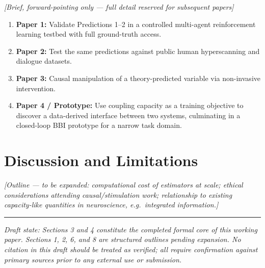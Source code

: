 \documentclass[11pt]{article}
\begin{document}
\textit{[Brief, forward-pointing only --- full detail reserved for subsequent papers]}

\begin{enumerate}[leftmargin=1.4em]
    \item \textbf{Paper 1:} Validate Predictions 1--2 in a controlled multi-agent reinforcement learning testbed with full ground-truth access.
    \item \textbf{Paper 2:} Test the same predictions against public human hyperscanning and dialogue datasets.
    \item \textbf{Paper 3:} Causal manipulation of a theory-predicted variable via non-invasive intervention.
    \item \textbf{Paper 4 / Prototype:} Use coupling capacity as a training objective to discover a data-derived interface between two systems, culminating in a closed-loop BBI prototype for a narrow task domain.
\end{enumerate}

\section{Discussion and Limitations}

\textit{[Outline --- to be expanded: computational cost of estimators at scale; ethical considerations attending causal/stimulation work; relationship to existing capacity-like quantities in neuroscience, e.g.\ integrated information.]}

\vspace{12pt}
\noindent\rule{\textwidth}{0.4pt}

\vspace{4pt}
\noindent \small \textit{Draft state: Sections 3 and 4 constitute the completed formal core of this working paper. Sections 1, 2, 6, and 8 are structured outlines pending expansion. No citation in this draft should be treated as verified; all require confirmation against primary sources prior to any external use or submission.}
\end{document}
